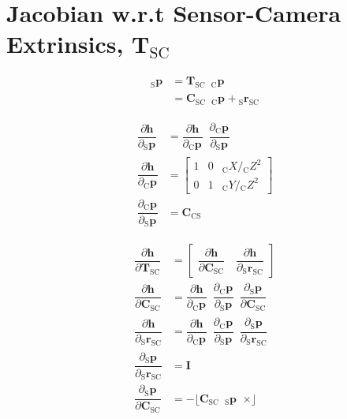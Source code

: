 \documentclass{report}
\renewcommand{\Vec}[1]{{\mathbf{#1}}}
\newcommand{\Mat}[1]{{\mathbf{#1}}}
\newcommand{\I}{{\Mat{I}}}
\newcommand{\Skew}[1]{{\lfloor #1 \enspace \times \rfloor}}
\newcommand{\tf}{\mathbf{T}}
\newcommand{\cam}{{\text{C}}}
\newcommand{\sensor}{{\text{S}}}
\newcommand{\fiducial}{{\text{F}}}
\newcommand{\KineNotationTransform}[3]{{{#1}_{#2#3}}}
\newcommand{\KineNotation}[3]{{{{}_{#2}} {#1}_{#2#3}}}
\newcommand{\KineNotationPart}[3]{{{{}_{#2}} {#1}_{#3}}}
\newcommand{\KineNotationBare}[2]{{{{}_{#2}} {#1}}}
\newcommand{\pos}{{\Vec{r}}}
\newcommand{\Pos}[2]{{\KineNotation{\pos}{#1}{#2}}}
\newcommand{\rot}{{\Mat{C}}}
\newcommand{\Rot}[2]{{\KineNotationTransform{\rot}{#1}{#2}}}
\newcommand{\tf}{{\Mat{T}}}
\newcommand{\Tf}[2]{{\KineNotationTransform{\tf}{#1}{#2}}}
\newcommand{\point}{\Vec{p}}
\newcommand{\Pt}[1]{{\KineNotationPart{\point}{#1}{}}}
\newcommand{\Point}[2]{{\KineNotationBare{\point}{#1}}}
\newcommand{\projFunc}{{\Vec{h}}}
\begin{document}
\section{Jacobian w.r.t Sensor-Camera Extrinsics, $\Tf{\sensor}{\cam}$}

\begin{align}
  \Point{\sensor}{\fiducial_{ij}}
  &=
    \Tf{\sensor}{\cam}
    \enspace \Pt{\cam} \\
  &=
    \Rot{\sensor}{\cam}
    \enspace \Pt{\cam}
		+ \Pos{\sensor}{\cam}
\end{align}

\begin{align}
  \dfrac{\partial{\projFunc}}{\partial{\Pt{\sensor}}}
		&=
			\dfrac{\partial{\projFunc}}{\partial{\Pt{\cam}}}
			\enspace
			\dfrac{\partial{\Pt{\cam}}}{\partial{\Pt{\sensor}}} \\
  \dfrac{\partial{\projFunc}}{\partial{\Pt{\cam}}}
		&=
			\begin{bmatrix}
				1 & 0 & \KineNotationBare{X}{\cam} / \KineNotationBare{Z}{\cam}^{2} \\
				0 & 1 & \KineNotationBare{Y}{\cam} / \KineNotationBare{Z}{\cam}^{2}
			\end{bmatrix} \\
  \dfrac{\partial{\Pt{\cam}}}{\partial{\Pt{\sensor}}}
		&= \Rot{\cam}{\sensor}
\end{align}


\begin{align}
  \dfrac{\partial{\projFunc}}{\partial{\Tf{\sensor}{\cam}}}
    &=
			\begin{bmatrix}
				\dfrac{\partial{\projFunc}}{\partial{\Rot{\sensor}{\cam}}}
				\quad
				\dfrac{\partial{\projFunc}}{\partial{\Pos{\sensor}{\cam}}}
			\end{bmatrix} \\
  \dfrac{\partial{\projFunc}}{\partial{\Rot{\sensor}{\cam}}}
    &=
      \dfrac{\partial{\projFunc}}{\partial{\Pt{\cam}}}
			\enspace
      \dfrac{\partial{\Pt{\cam}}}{\partial{\Pt{\sensor}}}
			\enspace
      \dfrac{\partial{\Pt{\sensor}}}{\partial{\Rot{\sensor}{\cam}}} \\
  \dfrac{\partial{\projFunc}}{\partial{\Pos{\sensor}{\cam}}}
    &=
      \dfrac{\partial{\projFunc}}{\partial{\Pt{\cam}}}
			\enspace
      \dfrac{\partial{\Pt{\cam}}}{\partial{\Pt{\sensor}}}
			\enspace
      \dfrac{\partial{\Pt{\sensor}}}{\partial{\Pos{\sensor}{\cam}}} \\
	\dfrac{\partial{\Pt{\sensor}}}{\partial{\Pos{\sensor}{\cam}}}
	  &= \I \\
	\dfrac{\partial{\Pt{\sensor}}}{\partial{\Rot{\sensor}{\cam}}}
    &= -\Skew{\Rot{\sensor}{\cam} \enspace \Pt{\sensor}}
\end{align}
\end{document}
